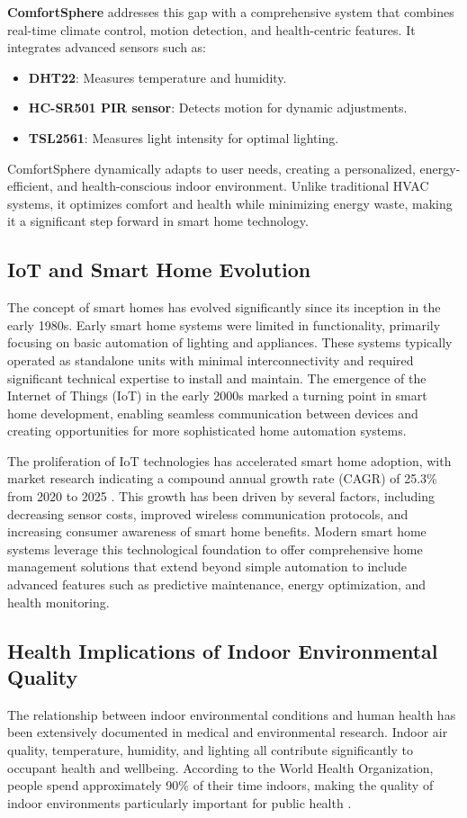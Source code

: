 \documentclass[a4paper]{scrartcl}
\begin{document}
	\textbf{ComfortSphere} addresses this gap with a comprehensive system that combines real-time climate control, motion detection, and health-centric features. It integrates advanced sensors such as:
	\begin{itemize}
		\item \textbf{DHT22}: Measures temperature and humidity.
		\item \textbf{HC-SR501 PIR sensor}: Detects motion for dynamic adjustments.
		\item \textbf{TSL2561}: Measures light intensity for optimal lighting.
	\end{itemize}

	ComfortSphere dynamically adapts to user needs, creating a personalized, energy-efficient, and health-conscious indoor environment. Unlike traditional HVAC systems, it optimizes comfort and health while minimizing energy waste, making it a significant step forward in smart home technology.
    
    \subsection{IoT and Smart Home Evolution}
    The concept of smart homes has evolved significantly since its inception in the early 1980s. Early smart home systems were limited in functionality, primarily focusing on basic automation of lighting and appliances. These systems typically operated as standalone units with minimal interconnectivity and required significant technical expertise to install and maintain. The emergence of the Internet of Things (IoT) in the early 2000s marked a turning point in smart home development, enabling seamless communication between devices and creating opportunities for more sophisticated home automation systems.
    
    The proliferation of IoT technologies has accelerated smart home adoption, with market research indicating a compound annual growth rate (CAGR) of 25.3\% from 2020 to 2025 \cite{paper27}. This growth has been driven by several factors, including decreasing sensor costs, improved wireless communication protocols, and increasing consumer awareness of smart home benefits. Modern smart home systems leverage this technological foundation to offer comprehensive home management solutions that extend beyond simple automation to include advanced features such as predictive maintenance, energy optimization, and health monitoring.
    
    \subsection{Health Implications of Indoor Environmental Quality}
    The relationship between indoor environmental conditions and human health has been extensively documented in medical and environmental research. Indoor air quality, temperature, humidity, and lighting all contribute significantly to occupant health and wellbeing. According to the World Health Organization, people spend approximately 90\% of their time indoors, making the quality of indoor environments particularly important for public health \cite{paper28}.
    
\end{document}
